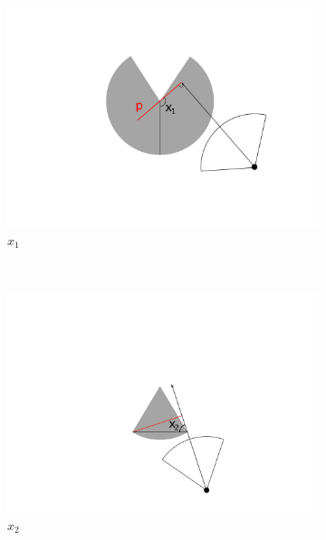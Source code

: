 \begin{figure}[t]
        \centering
        \begin{subfigure}[t]{0.34\textwidth}
                \centering
        \includegraphics[width=1\textwidth, trim=2cm 1cm 2cm 1cm]{imgs/x1.pdf}
                \caption{$x_1$}               
                \label{f:x1}
        \end{subfigure}
        ~ 
        \begin{subfigure}[t]{0.22\textwidth}
                \centering
        \includegraphics[width=1\textwidth, trim=9cm 2cm 9cm 2cm]{imgs/x2.pdf}
                \caption{$x_2$}               
                \label{f:x2}
        \end{subfigure}
        ~ 
	\begin{subfigure}[t]{0.22\textwidth}

\end{subfigure}
\end{figure}
